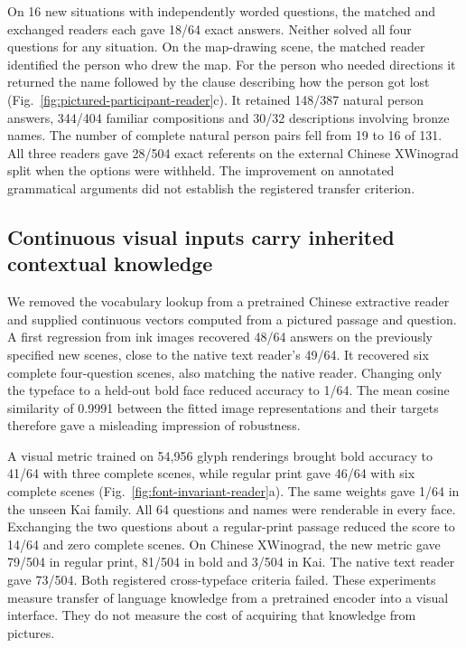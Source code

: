 \documentclass[12pt,a4paper]{article}
\providecommand{\DIFadd}[1]{{\protect\color{blue} \sf #1}} %
\begin{document}
\DIFadd{On 16 new situations with independently worded questions, the matched and exchanged readers each gave 18/64 exact answers. Neither solved all four questions for any situation. On the map-drawing scene, the matched reader identified the person who drew the map. For the person who needed directions it returned the name followed by the clause describing how the person got lost (Fig.~\ref{fig:pictured-participant-reader}c). It retained 148/387 natural person answers, 344/404 familiar compositions and 30/32 descriptions involving bronze names. The number of complete natural person pairs fell from 19 to 16 of 131. All three readers gave 28/504 exact referents on the external Chinese XWinograd split when the options were withheld. The improvement on annotated grammatical arguments did not establish the registered transfer criterion.
}

\subsection*{\DIFadd{Continuous visual inputs carry inherited contextual knowledge}}
\DIFadd{We removed the vocabulary lookup from a pretrained Chinese extractive reader and supplied continuous vectors computed from a pictured passage and question. A first regression from ink images recovered 48/64 answers on the previously specified new scenes, close to the native text reader's 49/64. It recovered six complete four-question scenes, also matching the native reader. Changing only the typeface to a held-out bold face reduced accuracy to 1/64. The mean cosine similarity of 0.9991 between the fitted image representations and their targets therefore gave a misleading impression of robustness.
}

\DIFadd{A visual metric trained on 54,956 glyph renderings brought bold accuracy to 41/64 with three complete scenes, while regular print gave 46/64 with six complete scenes (Fig.~\ref{fig:font-invariant-reader}a). The same weights gave 1/64 in the unseen Kai family. All 64 questions and names were renderable in every face. Exchanging the two questions about a regular-print passage reduced the score to 14/64 and zero complete scenes. On Chinese XWinograd, the new metric gave 79/504 in regular print, 81/504 in bold and 3/504 in Kai. The native text reader gave 73/504. Both registered cross-typeface criteria failed. These experiments measure transfer of language knowledge from a pretrained encoder into a visual interface. They do not measure the cost of acquiring that knowledge from pictures.
}
\end{document}
